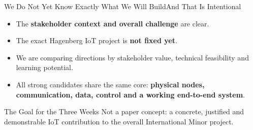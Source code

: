 \begin{frame}{We Do Not Yet Know Exactly What We Will Build}{And That Is Intentional}
\begin{itemize}
    \item The \textbf{stakeholder context and overall challenge} are clear.
    \item The exact Hagenberg IoT project is \textbf{not fixed yet}.
    \item We are comparing directions by stakeholder value, technical feasibility and learning potential.
    \item All strong candidates share the same core: \textbf{physical nodes, communication, data, control and a working end-to-end system}.
\end{itemize}
\begin{block}{The Goal for the Three Weeks}
Not a paper concept: a concrete, justified and demonstrable IoT contribution to the overall International Minor project.
\end{block}
\end{frame}
